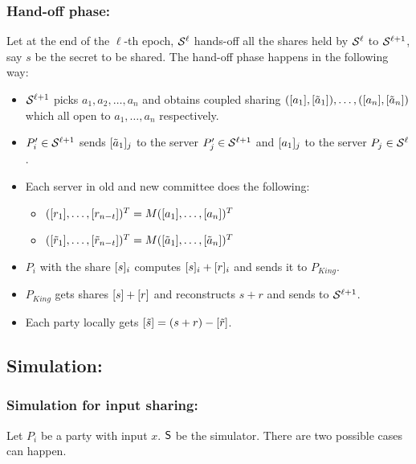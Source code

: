 \subsubsection{Hand-off phase: } Let at the end of the $\ell$-th epoch, $\mathcal{S}^{\ell}$ hands-off all the shares held by $\mathcal{S}^{\ell}$ to $\mathcal{S}^{\ell+1}$, say $s$ be the secret to be shared. The hand-off phase happens in the following way:
\begin{itemize}
	\item $\mathcal{S}^{\ell+1}$ picks $a_1, a_2, \ldots, a_n$ and obtains coupled sharing $([a_1], [\tilde{a}_1]), \ldots, ([a_n], [\tilde{a}_n])$ which all open to $a_1, \ldots, a_n$ respectively. 
	
	\item $P'_i\in \mathcal{S}^{\ell+1}$ sends $[\tilde{a}_1]_j$ to the server $P'_j\in \mathcal{S}^{\ell+1}$ and $[a_1]_j$ to the server $P_j\in\mathcal{S}^{\ell}$.
	
	\item Each server in old and new committee does the following: 
	\begin{itemize}
		\item $([r_1], \ldots, [r_{n-t}])^T = M([a_1], \ldots, [a_n])^T$
		\item $([\tilde{r}_1], \ldots, [\tilde{r}_{n-t}])^T = M([\tilde{a}_1], \ldots, [\tilde{a}_n])^T$
	\end{itemize}
	
	\item $P_i$ with the share $[s]_i$ computes $[s]_i+[r]_i$ and sends it to $P_{King}$.
	
	\item $P_{King}$ gets shares $[s]+[r]$ and reconstructs $s+r$ and sends to $\mathcal{S}^{\ell+1}$.
	
	\item Each party locally gets $[\tilde{s}] = (s+r)-[\tilde{r}]$.
\end{itemize}

\subsection{Simulation: }
\subsubsection{Simulation for input sharing: }
Let $P_i$ be a party with input $x$. $\mathsf{S}$ be the simulator. There are two possible cases can happen. 

